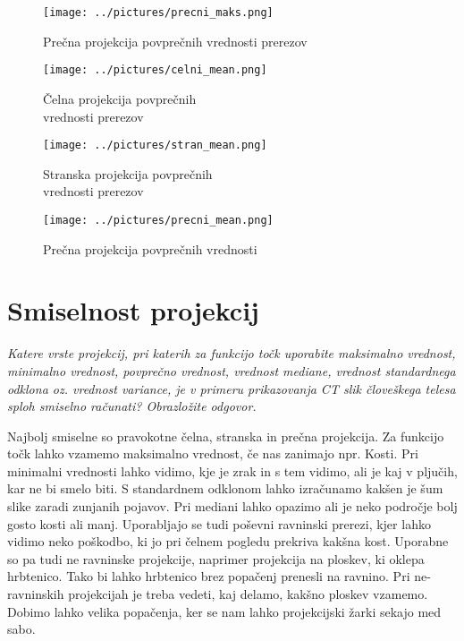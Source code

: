 \documentclass[12pt,a4paper]{article}
\begin{document}
\pagebreak
\begin{figure}[htb!]
  \begin{center}
    \texttt{[image: ../pictures/precni\_maks.png]}
    \caption{Prečna projekcija  povprečnih vrednosti prerezov}
  \end{center}
  \end{figure}
\pagebreak
\begin{figure}[!htb]
    \centering
    \begin{minipage}{.5\textwidth}
        \begin{center}
    \texttt{[image: ../pictures/celni\_mean.png]}
    \caption{Čelna projekcija povprečnih \\ vrednosti prerezov}
  \end{center}
    \end{minipage}%
    \begin{minipage}{0.5\textwidth}
        \begin{center}
    \texttt{[image: ../pictures/stran\_mean.png]}
    \caption{Stranska projekcija povprečnih \\ vrednosti prerezov}
  \end{center}
    \end{minipage}
\end{figure}


\pagebreak
\begin{figure}[htb!]
  \begin{center}
    \texttt{[image: ../pictures/precni\_mean.png]}
    \caption{Prečna projekcija povprečnih vrednosti }
  \end{center}
  \end{figure}
\section{Smiselnost projekcij}
\textit{Katere vrste projekcij, pri katerih za funkcijo točk uporabite maksimalno vrednost,
minimalno vrednost, povprečno vrednost, vrednost mediane, vrednost standardnega
odklona oz. vrednost variance, je v primeru prikazovanja CT slik človeškega telesa sploh
smiselno računati? Obrazložite odgovor.}

Najbolj smiselne so pravokotne čelna, stranska in prečna projekcija. Za funkcijo točk lahko vzamemo maksimalno vrednost, če nas zanimajo npr. Kosti. Pri minimalni vrednosti lahko vidimo, kje je zrak in s tem vidimo, ali je kaj v pljučih, kar ne bi smelo biti. S standardnem odklonom lahko izračunamo kakšen je šum slike zaradi zunjanih pojavov. Pri mediani lahko opazimo ali je neko področje bolj gosto kosti ali manj. Uporabljajo se tudi poševni ravninski prerezi, kjer lahko vidimo neko poškodbo, ki jo pri čelnem pogledu prekriva kakšna kost.  Uporabne so pa tudi ne ravninske projekcije, naprimer projekcija na ploskev, ki oklepa hrbtenico. Tako bi lahko hrbtenico brez popačenj prenesli na ravnino. Pri ne-ravninskih projekcijah je treba vedeti, kaj delamo,  kakšno ploskev vzamemo. Dobimo lahko velika popačenja, ker se nam lahko projekcijski žarki sekajo med sabo. 
\end{document}
